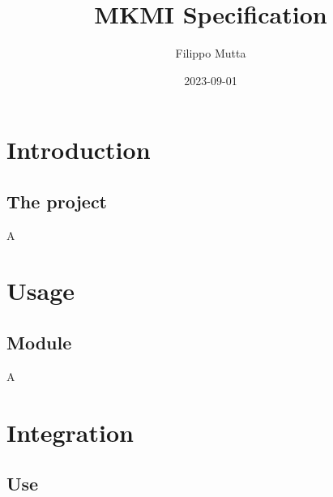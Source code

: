 \documentclass{report}
\title{MKMI Specification}
\date{2023-09-01}
\author{Filippo Mutta}
\begin{document}
\maketitle
\newpage


\tableofcontents

\chapter{Introduction}
\section{The project}
A
\chapter{Usage}
\section{Module}
A
\chapter{Integration}
\section{Use}
\end{document}
